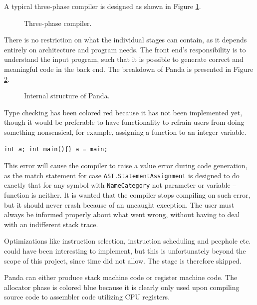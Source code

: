 A typical three-phase compiler is designed as shown in Figure \ref{fig:three-phase}.

\begin{figure}[H]
    \centering
    
    \caption{Three-phase compiler.}
    \label{fig:three-phase}
\end{figure}

There is no restriction on what the individual stages can contain, as it depends entirely on architecture and program needs. The front end's responsibility is to understand the input program, such that it is possible to generate correct and meaningful code in the back end. The breakdown of Panda is presented in Figure \ref{fig:panda-structure}.

\begin{figure}[H]
    \centering
    
    \caption{Internal structure of Panda.}
    \label{fig:panda-structure}
\end{figure}

Type checking has been colored red because it has not been implemented yet, though it would be preferable to have functionality to refrain users from doing something nonsensical, for example, assigning a function to an integer variable.

\begin{verbatim}
int a; int main(){} a = main;
\end{verbatim}

This error will cause the compiler to raise a value error during code generation, as the match statement for case \texttt{AST.StatementAssignment} is designed to do exactly that for any symbol with \texttt{NameCategory} not parameter or variable -- function is neither. It is wanted that the compiler stops compiling on such error, but it should never crash because of an uncaught exception. The user must always be informed properly about what went wrong, without having to deal with an indifferent stack trace.

Optimizations like instruction selection, instruction scheduling and peephole etc. could have been interesting to implement, but this is unfortunately beyond the scope of this project, since time did not allow. The stage is therefore skipped.

Panda can either produce stack machine code or register machine code. The allocator phase is colored blue because it is clearly only used upon compiling source code to assembler code utilizing CPU registers. 

